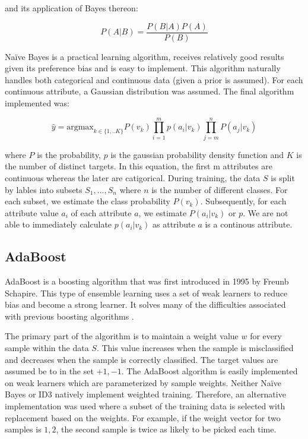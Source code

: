 \documentclass[11pt]{article}
\begin{document}
and its application of Bayes thereon:

$$P(A|B) = \frac{P(B|A)P(A)}{P(B)}$$

Naïve Bayes is a practical learning algorithm, receives relatively good results given its preference bias and is easy to implement. This algorithm naturally handles both categorical and continuous data (given a prior is assumed). For each continuous attribute, a Gaussian distribution was assumed. The final algorithm implemented was:

$$\hat{y}= \mathrm{argmax}_{k\in\{1,..K\}} P(v_k)\prod_{i=1}^mp\left(a_i|v_k\right)\prod_{j=m}^nP\left(a_j|v_k\right)$$

where $P$ is the probability, $p$ is the gaussian probability density function and $K$ is the number of distinct targets. In this equation, the first m attributes are continuous whereas the later are catigorical. During training, the data $S$ is split by lables into subsets ${S_1,...,S_n}$ where $n$ is the number of different classes. For each subset, we estimate the class probability $P(v_k)$. Subsequently, for each attribute value $a_i$ of each attribute $a$, we estimate $P(a_i|v_k)$ or $p$. We are not able to immediately calculate $p(a_i|v_k)$ as attribute $a$ is a continous attribute.

\subsection{AdaBoost} \label{adaboost}
AdaBoost is a boosting algorithm that was first introduced in 1995 by Freunb Schapire. This type of ensemble learning uses a set of weak learners to reduce bias and become a strong learner. It solves many of the difficulties associated with previous boosting algorithms \cite{Schapire:1999:BIB:1624312.1624417}.

The primary part of the algorithm is to maintain a weight value $w$ for every sample within the data $S$. This value increases when the sample is misclassified and decreases when the sample is correctly classified. The target values are assumed be to in the set ${+1, -1}$. The AdaBoost algorithm is easily implemented on weak learners which are parameterized by sample weights. Neither Naïve Bayes or ID3 natively implement weighted training. Therefore, an alternative implementation was used where a subset of the training data is selected with replacement based on the weights. For example, if the weight vector for two samples is ${1, 2}$, the second sample is twice as likely to be picked each time.
\end{document}
